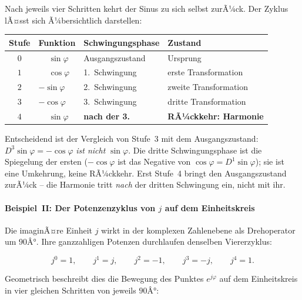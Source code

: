 ﻿\documentclass[a4paper,12pt]{article}
\theoremstyle{definition}
\begin{document}
Nach jeweils vier Schritten kehrt der Sinus zu sich selbst zurÃ¼ck. Der Zyklus
lÃ¤sst sich Ã¼bersichtlich darstellen:

\begin{center}
\begin{tabular}{clll}
	\toprule
	Stufe & Funktion & Schwingungsphase & Zustand \\
	\midrule
	$0$ & $\phantom{-}\sin\varphi$ & Ausgangszustand & Ursprung \\
	$1$ & $\phantom{-}\cos\varphi$ & 1.~Schwingung & erste Transformation \\
	$2$ & $-\sin\varphi$ & 2.~Schwingung & zweite Transformation \\
	$3$ & $-\cos\varphi$ & 3.~Schwingung & dritte Transformation \\
	$4$ & $\phantom{-}\sin\varphi$ & \textbf{nach der 3.} & \textbf{RÃ¼ckkehr: Harmonie} \\
	\bottomrule
\end{tabular}
\end{center}

Entscheidend ist der Vergleich von Stufe~3 mit dem Ausgangszustand: $D^3\sin\varphi
= -\cos\varphi$ \textit{ist nicht} $\sin\varphi$. Die dritte Schwingungsphase ist die
Spiegelung der ersten ($-\cos\varphi$ ist das Negative von $\cos\varphi = D^1\sin\varphi$);
sie ist eine Umkehrung, keine RÃ¼ckkehr. Erst Stufe~4 bringt den Ausgangszustand
zurÃ¼ck -- die Harmonie tritt \textit{nach} der dritten Schwingung ein, nicht mit ihr.

\paragraph{Beispiel~II: Der Potenzenzyklus von $j$ auf dem Einheitskreis}

Die imaginÃ¤re Einheit $j$ wirkt in der komplexen Zahlenebene als Drehoperator um
$90Â°$. Ihre ganzzahligen Potenzen durchlaufen denselben Viererzyklus:

\begin{equation}
	j^0 = 1, \qquad j^1 = j, \qquad j^2 = -1, \qquad j^3 = -j, \qquad j^4 = 1.
\end{equation}

Geometrisch beschreibt dies die Bewegung des Punktes $e^{j\varphi}$ auf dem
Einheitskreis in vier gleichen Schritten von jeweils $90Â°$:
\end{document}
